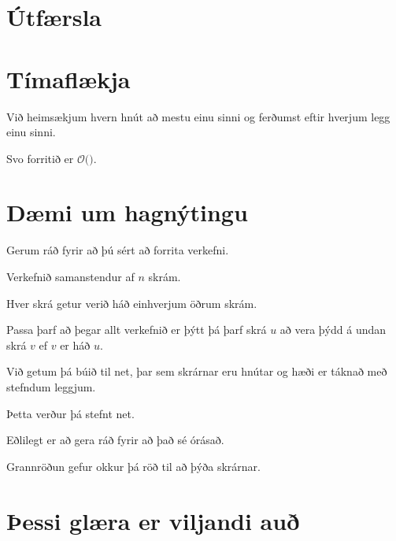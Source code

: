 \section{Útfærsla}
{
}

\section{Tímaflækja}
{
    {
        \item<1-> Við heimsækjum hvern hnút að mestu einu sinni og ferðumst eftir hverjum legg einu sinni.
        \item<2-> Svo forritið er $\mathcal{O}($$)$.
    }
}

\section{Dæmi um hagnýtingu}
{
    {
        \item<1-> Gerum ráð fyrir að þú sért að forrita verkefni.
        \item<2-> Verkefnið samanstendur af $n$ skrám.
        \item<3-> Hver skrá getur verið háð einhverjum öðrum skrám.
        \item<4-> Passa þarf að þegar allt verkefnið er þýtt þá þarf skrá $u$ að vera þýdd á undan skrá $v$ ef $v$ er háð $u$.
        \item<5-> Við getum þá búið til net, þar sem skrárnar eru hnútar og hæði er táknað með stefndum leggjum.
        \item<6-> Þetta verður þá stefnt net.
        \item<7-> Eðlilegt er að gera ráð fyrir að það sé órásað.
        \item<8-> Grannröðun gefur okkur þá röð til að þýða skrárnar.
    }
}

\section{Þessi glæra er viljandi auð}
{
}


